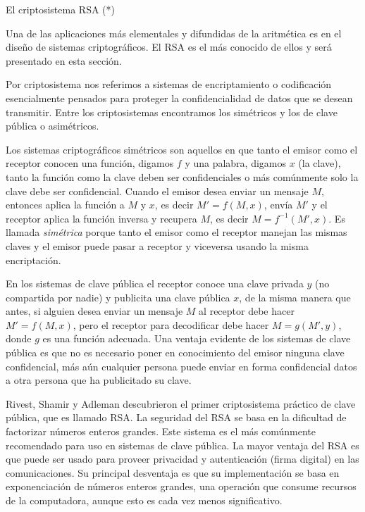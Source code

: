 \begin{section}{El criptosistema RSA (*)}\label{seccion-el-criptosistema-rsa}


Una de las aplicaciones más elementales y difundidas de la aritmética es en el diseño de sistemas criptográficos. El RSA es el más conocido de ellos y será presentado en esta sección. 

Por criptosistema nos referimos a sistemas de encriptamiento o codificación esencialmente pensados para proteger la    confidencialidad de datos que
se desean transmitir. Entre los criptosistemas encontramos los simétricos  y los de clave pública o asimétricos.
  

Los sistemas criptográficos simétricos son aquellos en que tanto el emisor como el receptor conocen una función, digamos $f$ y una palabra, digamos $x$ (la clave), tanto la función como la clave 
deben ser confidenciales o más comúnmente solo la clave debe ser confidencial. Cuando el emisor desea enviar un mensaje $M$, entonces aplica la función a $M$ y $x$, es decir $M'=f(M,x)$,
envía $M'$ y el receptor aplica la función inversa y recupera $M$, es decir $M=f^{-1}(M',x)$. Es llamada \emph{simétrica} porque tanto el emisor como el receptor manejan las mismas claves y el emisor puede pasar a receptor y viceversa usando la misma encriptación.   

En los sistemas de clave pública el receptor conoce una clave privada $y$ (no compartida por nadie) y publicita una clave pública $x$, de la misma manera que antes,  si alguien desea enviar un mensaje $M$ al receptor debe hacer $M'=f(M,x)$, pero el receptor para decodificar debe hacer $M=g(M',y)$, donde $g$ es una función adecuada. Una ventaja evidente de los sistemas de clave pública es que no es necesario poner en conocimiento del emisor ninguna clave confidencial, más aún cualquier persona puede enviar en forma confidencial datos a otra persona que ha publicitado su clave.


Rivest, Shamir y Adleman descubrieron el primer criptosistema práctico de clave pública, que es llamado RSA. La seguridad del RSA se basa en la dificultad de factorizar números enteros grandes. Este sistema es el más comúnmente recomendado para uso en sistemas de clave pública. La mayor ventaja del RSA es que puede ser usado para proveer privacidad y autenticación (firma digital) en las comunicaciones. Su principal desventaja es que su implementación se basa en exponenciación de números enteros grandes, una operación que consume recursos de la computadora, aunque esto es cada vez menos significativo.



\end{section}
